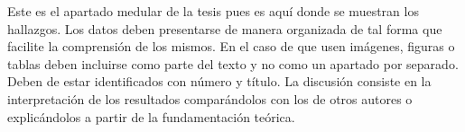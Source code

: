 Este es el apartado medular de la tesis pues es aquí donde se muestran los hallazgos. Los datos deben presentarse de manera organizada de tal forma que facilite la comprensión de los mismos. En el caso de que usen imágenes, figuras o tablas deben incluirse como parte del texto y no como un apartado por separado.
Deben de estar identificados con número y título.
La discusión consiste en la interpretación de los resultados comparándolos con los de otros autores o explicándolos a partir de la fundamentación teórica.
